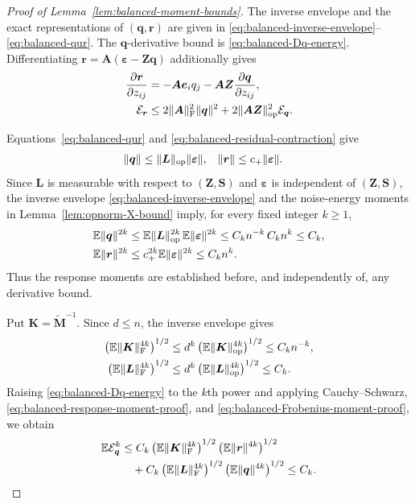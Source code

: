 \documentclass{article}
\theoremstyle{plain}
\theoremstyle{definition}
\theoremstyle{definition}
\DeclarePairedDelimiter\norm{\lVert}{\rVert}
\def\E{{\mathbb{E}}}
\def\mathbold{\boldsymbol}
\def\cal{\mathcal}
\def\bA{\mathbold{A}}\def\calA{{\cal A}}\def\scrA{{\mathscr A}}\def\Ahat{\widehat{A}}\def\Atil{{\widetilde A}}
\def\bK{\mathbold{K}}\def\hbK{{\widehat{\bK}}}\def\tbK{{\widetilde{\bK}}}
\def\bL{\mathbold{L}}\def\hbL{{\widehat{\bL}}}\def\tbL{{\widetilde{\bL}}}
\def\bM{\mathbold{M}}\def\hbM{{\widehat{\bM}}}\def\tbM{{\widetilde{\bM}}}
\def\bq{\mathbold{q}}\def\qhat{\widehat{q}}\def\qtil{\widetilde{q}}\def\qbar{{\overline q}}
\def\br{\mathbold{r}}\def\rhat{\widehat{r}}\def\rtil{\widetilde{r}}\def\rbar{{\overline r}}
\def\bS{\mathbold{S}}\def\hbS{{\widehat{\bS}}}\def\tbS{{\widetilde{\bS}}}
\def\be{\mathbold{e}}
\def\bZ{\mathbold{Z}}\def\hbZ{{\widehat{\bZ}}}\def\tbZ{{\widetilde{\bZ}}}
\def\ep{\varepsilon}\def\eps{\epsilon}\def\veps{\varepsilon}
\def\bep{ {\mathbold{\ep} }}
\begin{document}
\begin{proof}[Proof of Lemma~\ref{lem:balanced-moment-bounds}]
The inverse envelope and the exact representations of $(\bq,\br)$ are given
in \eqref{eq:balanced-inverse-envelope}--\eqref{eq:balanced-qur}.  The
$\bq$-derivative bound is \eqref{eq:balanced-Dq-energy}.
Differentiating $\br=\bA(\bep-\bZ\bq)$ additionally gives
\begin{align}
    \pdv{\br}{z_{ij}}
    &=-\bA\be_i q_j-\bA\bZ\pdv{\bq}{z_{ij}},\notag\\
    \calE_{\br}
    &\leq
      2\norm{\bA}_{\rm F}^2\norm{\bq}^2
      +2\norm{\bA\bZ}_{\rm op}^2\calE_{\bq}.
    \label{eq:balanced-Dr-energy}
\end{align}

Equations~\eqref{eq:balanced-qur} and
\eqref{eq:balanced-residual-contraction} give
\begin{align*}
    \norm{\bq}
    &\leq\norm{\bL}_{\rm op}\norm{\bep},
    &
    \norm{\br}
    &\leq c_+\norm{\bep}.
\end{align*}
Since $\bL$ is measurable with respect to $(\bZ,\bS)$ and $\bep$ is
independent of $(\bZ,\bS)$, the inverse envelope
\eqref{eq:balanced-inverse-envelope} and the noise-energy moments in
Lemma~\ref{lem:opnorm-X-bound} imply, for every fixed integer $k\geq1$,
\begin{align}
    \E\norm{\bq}^{2k}
    &\leq \E\norm{\bL}_{\rm op}^{2k}\,
       \E\norm{\bep}^{2k}
     \leq C_kn^{-k}\,C_kn^k
     \leq C_k,\notag\\
    \E\norm{\br}^{2k}
    &\leq c_+^{2k}\E\norm{\bep}^{2k}
     \leq C_kn^k.
    \label{eq:balanced-response-moment-proof}
\end{align}
Thus the response moments are established before, and independently of, any
derivative bound.

Put $\bK=\widetilde{\bM}^{-1}$.  Since $d\leq n$, the inverse envelope gives
\begin{align}
    \left(\E\norm{\bK}_{\rm F}^{4k}\right)^{1/2}
    &\leq d^k
       \left(\E\norm{\bK}_{\rm op}^{4k}\right)^{1/2}
      \leq C_kn^{-k},\notag\\
    \left(\E\norm{\bL}_{\rm F}^{4k}\right)^{1/2}
    &\leq d^k
       \left(\E\norm{\bL}_{\rm op}^{4k}\right)^{1/2}
      \leq C_k.
    \label{eq:balanced-Frobenius-moment-proof}
\end{align}
Raising \eqref{eq:balanced-Dq-energy} to the $k$th power and applying
Cauchy--Schwarz, \eqref{eq:balanced-response-moment-proof}, and
\eqref{eq:balanced-Frobenius-moment-proof}, we obtain
\begin{align}
    \E\calE_{\bq}^{k}
    &\leq C_k
       \left(\E\norm{\bK}_{\rm F}^{4k}\right)^{1/2}
       \left(\E\norm{\br}^{4k}\right)^{1/2}\notag\\
    &\quad+C_k
       \left(\E\norm{\bL}_{\rm F}^{4k}\right)^{1/2}
       \left(\E\norm{\bq}^{4k}\right)^{1/2}
     \leq C_k.
    \label{eq:balanced-Dq-all-moments}
\end{align}


\end{proof}
\end{document}
